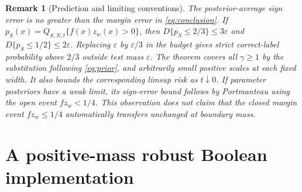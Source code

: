 \documentclass[11pt]{article}
\newtheorem{remark}[theorem]{Remark}
\begin{document}
\begin{remark}[Prediction and limiting conventions]
The posterior-average sign error is no greater than the margin error in
\eqref{eq:conclusion}. If $p_S(x)=Q_{S,N,t}\{f(x)z_w(x)>0\}$, then
$D\{p_S\le2/3\}\le3\varepsilon$ and
$D\{p_S\le1/2\}\le2\varepsilon$. Replacing $\varepsilon$ by
$\varepsilon/3$ in the budget gives strict correct-label probability above
$2/3$ outside test mass $\varepsilon$.
The theorem covers all $\gamma\ge1$ by the substitution following
\eqref{eq:prior}, and arbitrarily small positive scales at each fixed width.
It also bounds the corresponding limsup risk as $t\downarrow0$.
If parameter posteriors have a weak limit, its sign-error bound follows by
Portmanteau using the open event $fz_w<1/4$. This observation does not claim
that the closed margin event $fz_w\le1/4$ automatically transfers unchanged
at boundary mass.
\end{remark}

\section{A positive-mass robust Boolean implementation}
\end{document}
